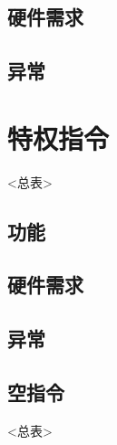     \subsection{硬件需求}
    \subsection{异常}

\section{特权指令}
<总表>
    \subsection{功能}
    \subsection{硬件需求}
    \subsection{异常}

\subsection{空指令}
<总表>

